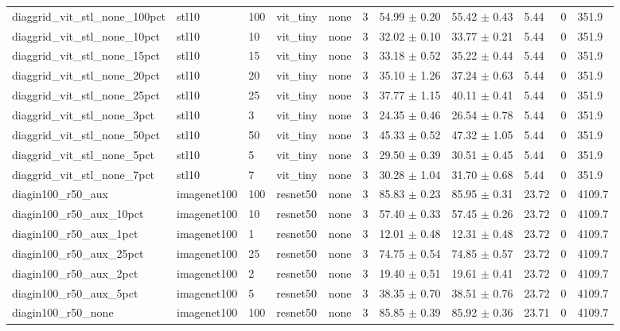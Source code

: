 \begin{tabular}{lllllllllll}
diaggrid_vit_stl_none_100pct & stl10 & 100 & vit_tiny & none & 3 & 54.99 $\pm$ 0.20 & 55.42 $\pm$ 0.43 & 5.44 & 0 & 351.9 \\
diaggrid_vit_stl_none_10pct & stl10 & 10 & vit_tiny & none & 3 & 32.02 $\pm$ 0.10 & 33.77 $\pm$ 0.21 & 5.44 & 0 & 351.9 \\
diaggrid_vit_stl_none_15pct & stl10 & 15 & vit_tiny & none & 3 & 33.18 $\pm$ 0.52 & 35.22 $\pm$ 0.44 & 5.44 & 0 & 351.9 \\
diaggrid_vit_stl_none_20pct & stl10 & 20 & vit_tiny & none & 3 & 35.10 $\pm$ 1.26 & 37.24 $\pm$ 0.63 & 5.44 & 0 & 351.9 \\
diaggrid_vit_stl_none_25pct & stl10 & 25 & vit_tiny & none & 3 & 37.77 $\pm$ 1.15 & 40.11 $\pm$ 0.41 & 5.44 & 0 & 351.9 \\
diaggrid_vit_stl_none_3pct & stl10 & 3 & vit_tiny & none & 3 & 24.35 $\pm$ 0.46 & 26.54 $\pm$ 0.78 & 5.44 & 0 & 351.9 \\
diaggrid_vit_stl_none_50pct & stl10 & 50 & vit_tiny & none & 3 & 45.33 $\pm$ 0.52 & 47.32 $\pm$ 1.05 & 5.44 & 0 & 351.9 \\
diaggrid_vit_stl_none_5pct & stl10 & 5 & vit_tiny & none & 3 & 29.50 $\pm$ 0.39 & 30.51 $\pm$ 0.45 & 5.44 & 0 & 351.9 \\
diaggrid_vit_stl_none_7pct & stl10 & 7 & vit_tiny & none & 3 & 30.28 $\pm$ 1.04 & 31.70 $\pm$ 0.68 & 5.44 & 0 & 351.9 \\
diagin100_r50_aux & imagenet100 & 100 & resnet50 & none & 3 & 85.83 $\pm$ 0.23 & 85.95 $\pm$ 0.31 & 23.72 & 0 & 4109.7 \\
diagin100_r50_aux_10pct & imagenet100 & 10 & resnet50 & none & 3 & 57.40 $\pm$ 0.33 & 57.45 $\pm$ 0.26 & 23.72 & 0 & 4109.7 \\
diagin100_r50_aux_1pct & imagenet100 & 1 & resnet50 & none & 3 & 12.01 $\pm$ 0.48 & 12.31 $\pm$ 0.48 & 23.72 & 0 & 4109.7 \\
diagin100_r50_aux_25pct & imagenet100 & 25 & resnet50 & none & 3 & 74.75 $\pm$ 0.54 & 74.85 $\pm$ 0.57 & 23.72 & 0 & 4109.7 \\
diagin100_r50_aux_2pct & imagenet100 & 2 & resnet50 & none & 3 & 19.40 $\pm$ 0.51 & 19.61 $\pm$ 0.41 & 23.72 & 0 & 4109.7 \\
diagin100_r50_aux_5pct & imagenet100 & 5 & resnet50 & none & 3 & 38.35 $\pm$ 0.70 & 38.51 $\pm$ 0.76 & 23.72 & 0 & 4109.7 \\
diagin100_r50_none & imagenet100 & 100 & resnet50 & none & 3 & 85.85 $\pm$ 0.39 & 85.92 $\pm$ 0.36 & 23.71 & 0 & 4109.7 \\

\end{tabular}
